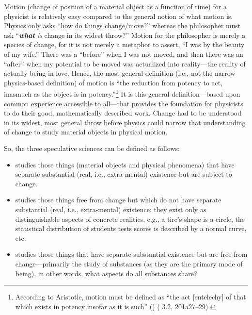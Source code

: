 \label{page:motion}Motion (change of position of a material object as a function of time) for a physicist is relatively easy compared to the general notion of what motion is. Physics only asks ``how do things change/move?'' whereas the philosopher must ask ``\textit{\textbf{what} is} change in its widest throw?'' Motion for the philosopher is merely a species of change, for it is not merely a metaphor to assert, ``I was  by the beauty of my wife.'' There was a ``before'' when I was not moved, and then there was an ``after'' when my potential to be moved was actualized into reality---the reality of actually being in love. Hence, the most general definition (i.e., not the narrow physics-based definition) of motion is ``the reduction from potency to act, inasmuch as the object is in potency.''\footnote{According to Aristotle, motion must be defined as ``the act [entelechy] of that which exists in potency insofar as it is such'' () ( 3.2, 201a27--29).} It is this general definition---based upon common experience accessible to all---that provides the foundation for physicists to do their good, mathematically described work. Change had to be understood in its widest, most general throw before physics could narrow that understanding of change to study material objects in physical motion.

So, the three speculative sciences can be defined as follows:

\begin{itemize}
\item {} studies those things (material objects and physical phenomena) that have separate substantial (real, i.e., extra-mental) existence but are subject to change.
\item {} studies those things free from change but which do not have separate substantial (real, i.e., extra-mental) existence: they exist only as distinguishable aspects of concrete realities, e.g., a tire's shape is a circle, the statistical distribution of students tests scores is described by a normal curve, etc.
\item {} studies those things that have separate substantial existence but are free from change---primarily the study of substances (as they are the primary mode of being), in other words, what aspects do all substances share?
\end{itemize}

